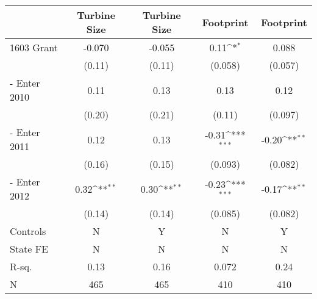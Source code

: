 {
\def\sym#1{\ifmmode^{#1}\else\(^{#1}\)\fi}
\begin{tabular}{l*{4}{c}}
\toprule
                &\multicolumn{1}{c}{Turbine Size}&\multicolumn{1}{c}{Turbine Size}&\multicolumn{1}{c}{Footprint}&\multicolumn{1}{c}{Footprint}\\
\midrule
1603 Grant      &   -0.070         &   -0.055         &     0.11\sym{*}  &    0.088         \\
                &   (0.11)         &   (0.11)         &  (0.058)         &  (0.057)         \\
\addlinespace
1603 - Enter 2010&     0.11         &     0.13         &     0.13         &     0.12         \\
                &   (0.20)         &   (0.21)         &   (0.11)         &  (0.097)         \\
\addlinespace
1603 - Enter 2011&     0.12         &     0.13         &    -0.31\sym{***}&    -0.20\sym{**} \\
                &   (0.16)         &   (0.15)         &  (0.093)         &  (0.082)         \\
\addlinespace
1603 - Enter 2012&     0.32\sym{**} &     0.30\sym{**} &    -0.23\sym{***}&    -0.17\sym{**} \\
                &   (0.14)         &   (0.14)         &  (0.085)         &  (0.082)         \\
\midrule
Controls        &        N         &        Y         &        N         &        Y         \\
State FE        &        N         &        N         &        N         &        N         \\
R-sq.           &     0.13         &     0.16         &    0.072         &     0.24         \\
N               &      465         &      465         &      410         &      410         \\
\bottomrule
\end{tabular}
}

